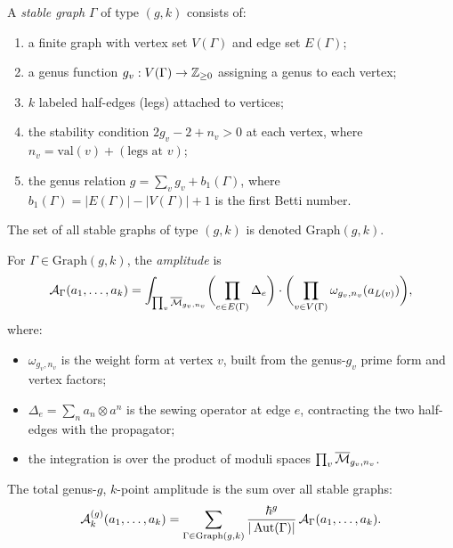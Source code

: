 \begin{definition}
A \emph{stable graph} $\Gamma$ of type $(g, k)$ consists of:
\begin{enumerate}[label=(\roman*)]
\item a finite graph with vertex set $V(\Gamma)$ and edge set
 $E(\Gamma)$;
\item a genus function $g_v : V(\Gamma) \to \mathbb{Z}_{\ge 0}$ assigning
 a genus to each vertex;
\item $k$ labeled half-edges (legs) attached to vertices;
\item the stability condition $2g_v - 2 + n_v > 0$ at each vertex,
 where $n_v = \mathrm{val}(v) + (\text{legs at } v)$;
\item the genus relation $g = \sum_v g_v + b_1(\Gamma)$, where
 $b_1(\Gamma) = |E(\Gamma)| - |V(\Gamma)| + 1$ is the first
 Betti number.
\end{enumerate}
The set of all stable graphs of type $(g, k)$ is denoted
$\mathrm{Graph}(g, k)$.
\end{definition}

\begin{construction}
For $\Gamma \in \mathrm{Graph}(g, k)$, the \emph{amplitude} is
\begin{equation}
\mathcal{A}_\Gamma(a_1, \ldots, a_k)
= \int_{\prod_v \overline{\mathcal{M}}_{g_v, n_v}}
\biggl(\prod_{e \in E(\Gamma)} \Delta_e\biggr)
\cdot
\biggl(\prod_{v \in V(\Gamma)}
\omega_{g_v, n_v}(a_{L(v)})\biggr),
\end{equation}
where:
\begin{itemize}
\item $\omega_{g_v, n_v}$ is the weight form at vertex $v$,
 built from the genus-$g_v$ prime form and vertex factors;
\item $\Delta_e = \sum_n a_n \otimes a^n$ is the sewing
 operator at edge $e$, contracting the two half-edges with the
 propagator;
\item the integration is over the product of moduli spaces
 $\prod_v \overline{\mathcal{M}}_{g_v, n_v}$.
\end{itemize}
The total genus-$g$, $k$-point amplitude is the sum over all
stable graphs:
\begin{equation}
\mathcal{A}_k^{(g)}(a_1, \ldots, a_k)
= \sum_{\Gamma \in \mathrm{Graph}(g, k)}
\frac{\hbar^{g}}{|\operatorname{Aut}(\Gamma)|}\,
\mathcal{A}_\Gamma(a_1, \ldots, a_k).
\end{equation}
\end{construction}

